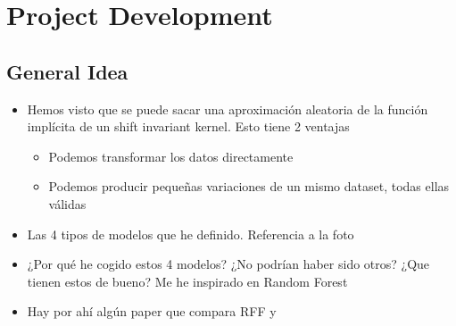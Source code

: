 
\chapter{Project Development} %

\label{Chapter3} %


\section{General Idea}
\begin{note}
  \begin{itemize}
    \item Hemos visto que se puede sacar una aproximación aleatoria de la
    función implícita de un shift invariant kernel. Esto tiene 2 ventajas
    \begin{itemize}
      \item Podemos transformar los datos directamente
      \item Podemos producir pequeñas variaciones de un mismo dataset, todas
      ellas válidas
    \end{itemize}
    \item Las 4 tipos de modelos que he definido. Referencia a la foto
    \item ¿Por qué he cogido estos 4 modelos? ¿No podrían haber sido otros?
    ¿Que tienen estos de bueno? Me he inspirado en Random Forest
    \item Hay por ahí algún paper que compara RFF y \Nys
  \end{itemize}
\end{note}
